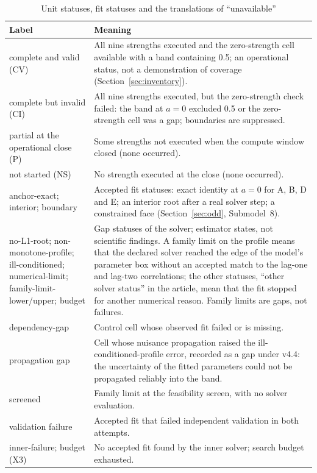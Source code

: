 \begin{table}[htbp]
\caption{Unit statuses, fit statuses and the translations of ``unavailable''}\label{tab:glossary-states}
\centering\footnotesize
\begin{tabular}{@{}>{\raggedright\arraybackslash}p{}>{\raggedright\arraybackslash}p{}@{}}
\toprule
Label & Meaning \\
\midrule
complete and valid (CV) & All nine strengths executed and the zero-strength cell available with a band containing 0.5; an operational status, not a demonstration of coverage (Section~\ref{sec:inventory}). \\
complete but invalid (CI) & All nine strengths executed, but the zero-strength check failed: the band at $a=0$ excluded 0.5 or the zero-strength cell was a gap; boundaries are suppressed. \\
partial at the operational close (P) & Some strengths not executed when the compute window closed (none occurred). \\
not started (NS) & No strength executed at the close (none occurred). \\
anchor-exact; interior; boundary & Accepted fit statuses: exact identity at $a=0$ for A, B, D and E; an interior root after a real solver step; a constrained face (Section~\ref{sec:odd}, Submodel~8). \\
no-L1-root; non-monotone-profile; ill-conditioned; numerical-limit; family-limit-lower/upper; budget & Gap statuses of the solver; estimator states, not scientific findings. A family limit on the profile means that the declared solver reached the edge of the model's parameter box without an accepted match to the lag-one and lag-two correlations; the other statuses, ``other solver status'' in the article, mean that the fit stopped for another numerical reason. Family limits are gaps, not failures. \\
dependency-gap & Control cell whose observed fit failed or is missing. \\
propagation gap & Cell whose nuisance propagation raised the ill-conditioned-profile error, recorded as a gap under v4.4: the uncertainty of the fitted parameters could not be propagated reliably into the band. \\
screened & Family limit at the feasibility screen, with no solver evaluation. \\
validation failure & Accepted fit that failed independent validation in both attempts. \\
inner-failure; budget (X3) & No accepted fit found by the inner solver; search budget exhausted. \\

\end{tabular}
\end{table}
